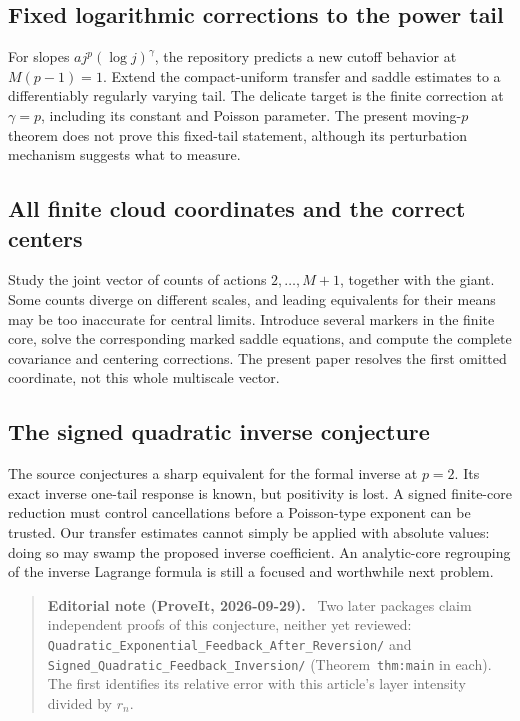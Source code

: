 \documentclass[11pt,a4paper]{article}
\numberwithin{equation}{section}
\theoremstyle{definition}
\theoremstyle{remark}
\newenvironment{ednote}{\par\smallskip\begin{quote}\small\raggedright\textbf{Editorial note (ProveIt, 2026-09-29).}\ }{\end{quote}\smallskip}
\begin{document}
\subsection{Fixed logarithmic corrections to the power tail}
For slopes $a j^p(\log j)^\gamma$, the repository predicts a new cutoff
behavior at $M(p-1)=1$. Extend the compact-uniform transfer and saddle
estimates to a differentiably regularly varying tail. The delicate target
is the finite correction at $\gamma=p$, including its constant and
Poisson parameter. The present moving-$p$ theorem does not prove this
fixed-tail statement, although its perturbation mechanism suggests what to
measure.

\subsection{All finite cloud coordinates and the correct centers}
Study the joint vector of counts of actions $2,\ldots,M+1$, together with
the giant. Some counts diverge on different scales, and leading equivalents
for their means may be too inaccurate for central limits. Introduce several
markers in the finite core, solve the corresponding marked saddle equations,
and compute the complete covariance and centering corrections. The present
paper resolves the first omitted coordinate, not this whole multiscale vector.

\subsection{The signed quadratic inverse conjecture}
The source \cite{finite-core} conjectures a sharp equivalent for the formal
inverse at $p=2$. Its exact inverse one-tail response is known, but positivity
is lost. A signed finite-core reduction must control cancellations before a
Poisson-type exponent can be trusted. Our transfer estimates cannot simply
be applied with absolute values: doing so may swamp the proposed inverse
coefficient. An analytic-core regrouping of the inverse Lagrange formula is
still a focused and worthwhile next problem.
\begin{ednote}
Two later packages claim independent proofs of this conjecture, neither
yet reviewed: \nolinkurl{Quadratic_Exponential_Feedback_After_Reversion/}
and \nolinkurl{Signed_Quadratic_Feedback_Inversion/} (Theorem~\texttt{thm:main} in
each). The first identifies its relative error with this article's layer
intensity divided by $r_n$.
\end{ednote}
\end{document}
